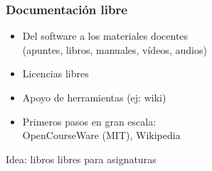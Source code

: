 \documentclass[17pt,aspectratio=169]{beamer}
\begin{document}
\begin{frame}
\frametitle{Documentación libre}

\begin{itemize}
\item Del software a los materiales docentes \\
  (apuntes, libros, manuales, vídeos, audios)
\item Licencias libres
\item Apoyo de herramientas (ej: wiki)
\item Primeros pasos en gran escala: \\
  OpenCourseWare (MIT), Wikipedia
\end{itemize}

{\Large
\begin{center}
Idea: libros libres para asignaturas
\end{center}
}

\end{frame}

\end{document}
